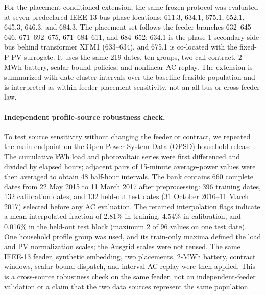 \documentclass[11pt]{article}
\begin{document}
For the placement-conditioned extension, the same frozen protocol was evaluated at seven predeclared IEEE-13 bus-phase locations: 611.3, 634.1, 675.1, 652.1, 645.3, 646.3, and 684.3. The placement set follows the feeder branches 632--645--646, 671--692--675, 671--684--611, and 684--652; 634.1 is the phase-1 secondary-side bus behind transformer XFM1 (633--634), and 675.1 is co-located with the fixed-P PV surrogate. It uses the same 219 dates, ten groups, two-call contract, 2-MWh battery, scalar-bound policies, and nonlinear AC replay. The extension is summarized with date-cluster intervals over the baseline-feasible population and is interpreted as within-feeder placement sensitivity, not an all-bus or cross-feeder law.

\paragraph{Independent profile-source robustness check.} To test source sensitivity without changing the feeder or contract, we repeated the main endpoint on the Open Power System Data (OPSD) household release \cite{OPSD2020}. The cumulative kWh load and photovoltaic series were first differenced and divided by elapsed hours; adjacent pairs of 15-minute average-power values were then averaged to obtain 48 half-hour intervals. The bank contains 660 complete dates from 22 May 2015 to 11 March 2017 after preprocessing: 396 training dates, 132 calibration dates, and 132 held-out test dates (31 October 2016--11 March 2017) selected before any AC evaluation. The retained interpolation flags indicate a mean interpolated fraction of 2.81\% in training, 4.54\% in calibration, and 0.016\% in the held-out test block (maximum 2 of 96 values on one test date). One household profile group was used, and its train-only maxima defined the load and PV normalization scales; the Ausgrid scales were not reused. The same IEEE-13 feeder, synthetic embedding, two placements, 2-MWh battery, contract windows, scalar-bound dispatch, and interval AC replay were then applied. This is a cross-source robustness check on the same feeder, not an independent-feeder validation or a claim that the two data sources represent the same population.
\end{document}
